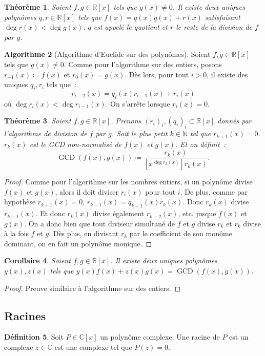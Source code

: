 \documentclass{article}
\DeclareMathOperator{\GCD}{GCD}
\newcommand{\N}{\mathbb N}
\newcommand{\R}{\mathbb R}
\newcommand{\C}{\mathbb C}
\newtheorem{thm}{Théorème}[section]
\newtheorem{cor}[thm]{Corollaire}
\theoremstyle{definition}
\newtheorem{alg}[thm]{Algorithme}
\newtheorem{déf}[thm]{Définition}
\theoremstyle{remark}
\begin{document}
		\begin{thm} Soient $f, g \in \R[x]$ tels que $g(x) \neq 0$. Il existe deux uniques polynômes $q, r \in \R[x]$ tels que $f(x) = q(x)g(x) + r(x)$ satisfaisant
		$\deg r(x) < \deg g(x)$. $q$ est appelé le quotient et $r$ le reste de la division de $f$ par $g$. \end{thm}

		\begin{alg}[Algorithme d'Euclide sur des polynômes] Soient $f, g \in \R[x]$ tels que $g(x) \neq 0$. Comme pour l'algorithme sur des entiers, posons
		$r_{-1}(x) \coloneqq f(x)$ et $r_0(x) = g(x)$. Dès lors, pour tout $i > 0$, il existe des uniques $q_i, r_i$ tels que~:\[r_{i-2}(x) = q_i(x)r_{i-1}(x) + r_i(x)\]
		où $\deg r_i(x) < \deg r_{i-1}(x)$. On s'arrête lorsque $r_i(x) = 0$. \end{alg}
	
		\begin{thm} Soient $f, g \in \R[x]$. Prenons $(r_i)_i, (q_i)_i \subset \R[x]$ donnés par l'algorithme de division de $f$ par $g$. Soit le plus petit $k \in \N$
		tel que $r_{k+1}(x) = 0$. $r_k(x)$ est le GCD non-normalisé de $f(x)$ et $g(x)$. Et on définit~:
		\[\GCD(f(x), g(x)) \coloneqq \frac {r_k(x)}{[x^{\deg r_k(x)}]r_k(x)}.\] \end{thm}

		\begin{proof} Comme pour l'algorithme sur les nombres entiers, si un polynôme divise $f(x)$ et $g(x)$, alors il doit diviser $r_i(x)$ pour tout $i$. De plus,
		comme par hypothèse $r_{k+1}(x) = 0$, $r_{k-1}(x) = q_{k+1}(x)r_k(x)$. Donc $r_k(x)$ divise $r_{k-1}(x)$. Et donc $r_k(x)$ divise également $r_{k-2}(x)$, etc.
		jusque $f(x)$ et $g(x)$. On a donc bien que tout diviseur simultané de $f$ et $g$ divise $r_k$ et $r_k$ divise à la fois $f$ et $g$. Dès plus, en divisant
		$r_k$ par le coefficient de son monôme dominant, on en fait un polynôme monique. \end{proof}

		\begin{cor} Soient $f, g \in \R[x]$. Il existe deux uniques polynômes $y(x), z(x)$ tels que $y(x)f(x)+z(x)g(x) = \GCD(f(x), g(x))$. \end{cor}

		\begin{proof} Preuve similaire à l'algorithme sur des entiers. \end{proof}

	\subsection{Racines}
		\begin{déf} Soit $P \in \C[x]$ un polynôme complexe. Une racine de $P$ est un complexe $z \in \C$ est une complexe tel que $P(z) = 0$. \end{déf}
\end{document}
